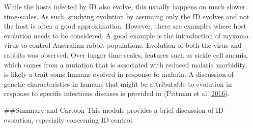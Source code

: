 \documentclass[]{book}
\theoremstyle{definition}
\theoremstyle{definition}
\theoremstyle{definition}
\theoremstyle{remark}
\begin{document}
While the hosts infected by ID also evolve, this usually happens on much
slower time-scales. As such, studying evolution by assuming only the ID
evolves and not the host is often a good approximation. However, there
are examples where host evolution needs to be considered. A good example
is the introduction of myxoma virus to control Australian rabbit
populations. Evolution of both the virus and rabbits was observed. Over
longer time-scales, features such as sickle cell anemia, which comes
from a mutation that is associated with reduced malaria morbidity, is
likely a trait some humans evolved in response to malaria. A discussion
of genetic characteristics in humans that might be attributable to
evolution in response to specific infectious diseases is provided in
(Pittman et al. \protect\hyperlink{ref-pittman16}{2016}).

\#\#Summary and Cartoon This module provides a brief discussion of
ID-evolution, especially concerning ID control.
\end{document}
